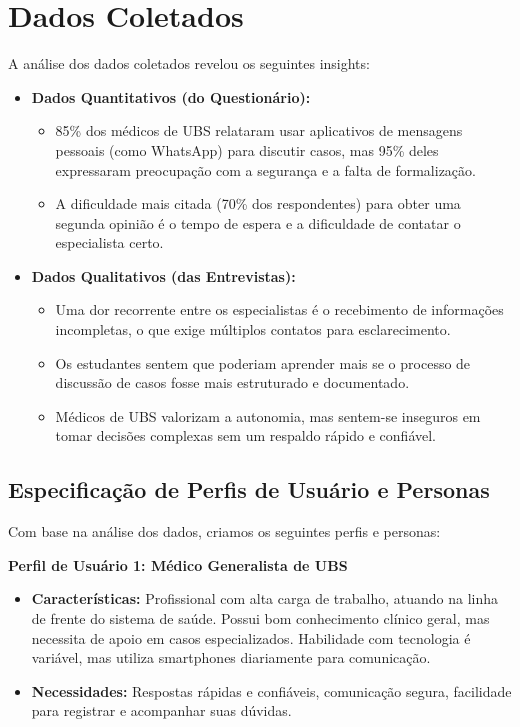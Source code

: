 \documentclass[12pt, a4paper, oneside]{abntex2}
\begin{document}
\section{Dados Coletados}
\label{sec:dados_coletados}
A análise dos dados coletados revelou os seguintes insights:
\begin{itemize}
    \item \textbf{Dados Quantitativos (do Questionário):}
    \begin{itemize}
        \item 85\% dos médicos de UBS relataram usar aplicativos de mensagens pessoais (como WhatsApp) para discutir casos, mas 95\% deles expressaram preocupação com a segurança e a falta de formalização.
        \item A dificuldade mais citada (70\% dos respondentes) para obter uma segunda opinião é o tempo de espera e a dificuldade de contatar o especialista certo.
    \end{itemize}
    \item \textbf{Dados Qualitativos (das Entrevistas):}
    \begin{itemize}
        \item Uma dor recorrente entre os especialistas é o recebimento de informações incompletas, o que exige múltiplos contatos para esclarecimento.
        \item Os estudantes sentem que poderiam aprender mais se o processo de discussão de casos fosse mais estruturado e documentado.
        \item Médicos de UBS valorizam a autonomia, mas sentem-se inseguros em tomar decisões complexas sem um respaldo rápido e confiável.
    \end{itemize}
\end{itemize}

\subsection{Especificação de Perfis de Usuário e Personas}
Com base na análise dos dados, criamos os seguintes perfis e personas:

\textbf{Perfil de Usuário 1: Médico Generalista de UBS}
\begin{itemize}
    \item \textbf{Características:} Profissional com alta carga de trabalho, atuando na linha de frente do sistema de saúde. Possui bom conhecimento clínico geral, mas necessita de apoio em casos especializados. Habilidade com tecnologia é variável, mas utiliza smartphones diariamente para comunicação.
    \item \textbf{Necessidades:} Respostas rápidas e confiáveis, comunicação segura, facilidade para registrar e acompanhar suas dúvidas.
\end{itemize}
\end{document}
